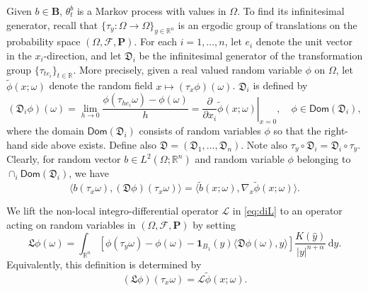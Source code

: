 \documentclass[11pt,reqno]{amsart}
\theoremstyle{definition}
\theoremstyle{remark}
\numberwithin{equation}{section}
\def\bP{\mathbf{P}}
\newcommand{\R}{{\mathbb{R}}}
\newcommand{\Dom}{\textsf{Dom}}
\begin{document}
Given $b \in \mathbf{B}$, $\theta^b_t$ is a Markov process with values in $\Omega$. To find its infinitesimal generator, recall that $\{\tau_{y}:\Omega\rightarrow \Omega\}_{y\in\mathbb{R}^n}$ is an ergodic group of translations on the probability space $(\Omega,\mathscr{F},\bP)$. For each $i=1,\dots,n$, let $e_i$ denote the unit vector in the $x_i$-direction, and let $\mathfrak{D}_i$ be the infinitesimal generator of the transformation group $\{\tau_{te_i}\}_{t\in\R}$. More precisely, given a real valued random variable $\phi$ on $\Omega$, let $\widetilde{\phi}(x;\omega)$ denote the random field $x\mapsto (\tau_x \phi)(\omega)$. $\mathfrak{D}_i$ is defined by
$$
(\mathfrak{D}_i \phi)(\omega) = \lim_{h\to 0} \frac{\phi(\tau_{he_i}\omega)-\phi(\omega)}{h} = \left.\frac{\partial}{\partial x_i} \widetilde{\phi}(x;\omega)
\right\rvert_{x=0}, \quad  \phi \in \Dom(\mathfrak{D}_i),
$$
where the domain $\Dom(\mathfrak{D}_i)$ consists of random variables $\phi$ so that the right-hand side above exists. Define also $\mathfrak{D} = (\mathfrak{D}_1,\dots,\mathfrak{D}_n)$. Note also $\tau_y \circ \mathfrak{D}_i = \mathfrak{D}_i\circ\tau_{y}$. Clearly, for random vector $b\in L^2(\Omega;\R^n)$ and random variable $\phi$ belonging to $\cap_i \Dom(\mathfrak{D}_i)$, we have
\begin{equation}
\label{eq:absD}
\langle b(\tau_x\omega),(\mathfrak{D}\phi)(\tau_x \omega)\rangle = \langle \widetilde{b}(x;\omega),\nabla_x\widetilde{\phi}(x;\omega)\rangle.
\end{equation}


We lift the non-local integro-differential operator $\mathscr{L}$ in \eqref{eq:diL} to an operator acting on random variables in $(\Omega,\mathscr{F},\bP)$ by setting
\begin{equation}
\label{eq:absL}
    \mathfrak{L} \phi(\omega)  = \int_{\mathbb{R}^{n}} [\phi(\tau_{y}\omega)-\phi(\omega)-\mathbf{1}_{B_1}(y)\langle \mathfrak{D} \phi(\omega), y\rangle ]\frac{K(\hat{y})}{|y|^{n+\alpha}}\,\mathrm{d}y.
\end{equation}
Equivalently, this definition is determined by
\begin{equation*}
\left(\mathfrak{L} \phi\right)(\tau_x \omega) = \mathscr{L}\widetilde{\phi}(x;\omega).
\end{equation*}
\end{document}
